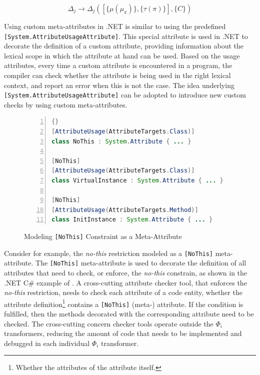 \begin{equation}
\Delta_j \rightarrow \Delta_j([\{\mu(\mu_{\pi})\},\{\tau(\pi)\}], \{C\})
\label{eq.delta}
\end{equation}

Using custom meta-attributes in .NET \cite{www.dotnet} is similar to using the predefined \texttt{[Sy\-stem.\-Attri\-bu\-te\-Usa\-ge\-Attri\-bu\-te]}. This special attribute is used in .NET to decorate the definition of a custom attribute, providing information about the lexical scope in which the attribute at hand can be used. Based on the usage attributes, every time a custom attribute is encountered in a program, the compiler can check whether the attribute is being used in the right lexical context, and report an error when this is not the case. The idea underlying \texttt{[Sy\-stem.\-Attri\-bu\-te\-Usa\-ge\-Attri\-bu\-te]} can be adopted to introduce new custom checks by using custom meta-attributes. 

\begin{figure}[ht]
	\begin{center}
	\begin{minipage}{12cm}
	\begin{scriptsize}
\begin{lstlisting}[numbers=left,language=Java,frame=leftline]{}
[AttributeUsage(AttributeTargets.Class)]
class NoThis : System.Attribute { ... }

[NoThis]
[AttributeUsage(AttributeTargets.Class)]
class VirtualInstance : System.Attribute { ... }

[NoThis]
[AttributeUsage(AttributeTargets.Method)]
class InitInstance : System.Attribute { ... }
\end{lstlisting}
\end{scriptsize}
\end{minipage}
\end{center}
\caption{Modeling \texttt{[NoThis]} Constraint as a Meta-Attribute}
\label{fig:no-this}
\end{figure}

Consider for example, the \textit{no-this} restriction  modeled as a \texttt{[No\-This]} me\-ta-attri\-bu\-te. The \texttt{[No\-This]} meta-attribute is used to decorate the definition of all attributes that need to check, or enforce, the \textit{no-this} constrain, as shown in the .NET C\# example of . A cross-cutting attribute checker tool, that enforces the \textit{no-this} restriction, needs to check each attribute of a code entity, whether the attribute definition\footnote{Whether the attributes of the attribute itself.} contains a \texttt{[No\-This]} (meta-) attribute. If the condition is fulfilled, then the methods decorated with the corresponding attribute need to be checked. The cross-cutting concern checker tools operate outside the $\Phi_i$ transformers, reducing the amount of code that needs to be implemented and debugged in each individual $\Phi_i$ transformer.

